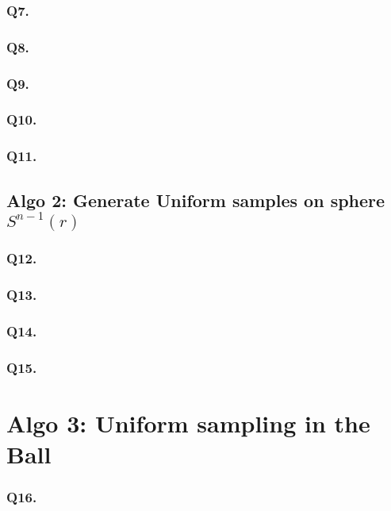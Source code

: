 \documentclass[11pt]{article}
\begin{document}
\subsubsection{Q7. }

\subsubsection{Q8. }

\subsubsection{Q9. }

\subsubsection{Q10. }

\subsubsection{Q11. }

\subsection{Algo 2: Generate Uniform samples on sphere $S^{n-1}(r)$}

\subsubsection{Q12. }

\subsubsection{Q13. }
 
\subsubsection{Q14. }

\subsubsection{Q15. }

\section{Algo 3: Uniform sampling in the Ball} 
 
 \subsubsection{Q16. }
\end{document}
